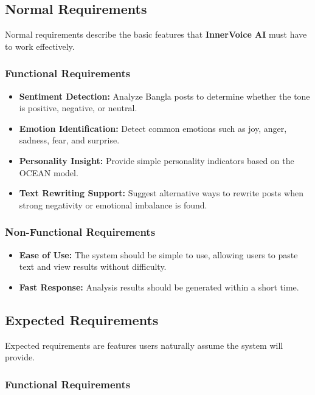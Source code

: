 \documentclass[12pt,a4paper]{report}
\begin{document}
\subsection{Normal Requirements}

Normal requirements describe the basic features that \textbf{InnerVoice AI} must have to work effectively.

\subsubsection{Functional Requirements}

\begin{itemize}
    \item \textbf{Sentiment Detection:} Analyze Bangla posts to determine whether the tone is positive, negative, or neutral.
    \item \textbf{Emotion Identification:} Detect common emotions such as joy, anger, sadness, fear, and surprise.
    \item \textbf{Personality Insight:} Provide simple personality indicators based on the OCEAN model.
    \item \textbf{Text Rewriting Support:} Suggest alternative ways to rewrite posts when strong negativity or emotional imbalance is found.
\end{itemize}

\subsubsection{Non-Functional Requirements}

\begin{itemize}
    \item \textbf{Ease of Use:} The system should be simple to use, allowing users to paste text and view results without difficulty.
    \item \textbf{Fast Response:} Analysis results should be generated within a short time.
\end{itemize}

\subsection{Expected Requirements}

Expected requirements are features users naturally assume the system will provide.

\subsubsection{Functional Requirements}
\end{document}
